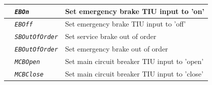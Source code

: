 \documentclass{template/openetcs}
\begin{document}
\begin{itemize}
\begin{longtable}{|l|l|l|}
			\hline
			
			&	\begin{minipage}[t]{0.40\linewidth} \emph{\texttt{EBOn}} \end{minipage}
			&	\begin{minipage}[t]{0.38\linewidth} Set emergency brake TIU input to ’on’ \end{minipage} \\
			
			\hline
			
			&	\begin{minipage}[t]{0.40\linewidth} \emph{\texttt{EBOff}} \end{minipage}
			&	\begin{minipage}[t]{0.38\linewidth} Set emergency brake TIU input to ’off’ \end{minipage} \\
			
			\hline
			
			&	\begin{minipage}[t]{0.40\linewidth} \emph{\texttt{SBOutOfOrder}} \end{minipage}
			&	\begin{minipage}[t]{0.38\linewidth} Set service brake out of order \end{minipage} \\
			
			\hline
			
			&	\begin{minipage}[t]{0.40\linewidth} \emph{\texttt{EBOutOfOrder}} \end{minipage}
			&	\begin{minipage}[t]{0.38\linewidth} Set emergency brake out of order \end{minipage} \\
			
			\hline
			
			&	\begin{minipage}[t]{0.40\linewidth} \emph{\texttt{MCBOpen}} \end{minipage}
			&	\begin{minipage}[t]{0.38\linewidth} Set main circuit breaker TIU input to ’open’ \end{minipage} \\
			
			\hline
			
			&	\begin{minipage}[t]{0.40\linewidth} \emph{\texttt{MCBClose}} \end{minipage}
			&	\begin{minipage}[t]{0.38\linewidth} Set main circuit breaker TIU input to ’close’ \end{minipage} \\
			

\end{longtable}
\end{itemize}
\end{document}

